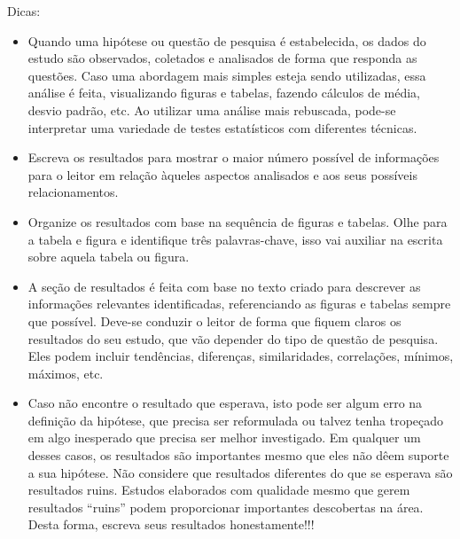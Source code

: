 Dicas:
    \begin{itemize}
        \item Quando uma hipótese ou questão de pesquisa é estabelecida, os dados do estudo são observados, coletados e analisados de forma que responda as questões. Caso uma abordagem mais simples esteja sendo utilizadas, essa análise é feita, visualizando figuras e tabelas, fazendo cálculos de média, desvio padrão, etc. Ao utilizar uma análise mais rebuscada, pode-se interpretar uma variedade de testes estatísticos com diferentes técnicas.
        \item Escreva os resultados para mostrar o maior número possível de informações para o leitor em relação àqueles aspectos analisados e aos seus possíveis relacionamentos.
    \item Organize os resultados com base na sequência de figuras e tabelas. Olhe para a tabela e figura e identifique três palavras-chave, isso vai auxiliar na escrita sobre aquela tabela ou figura.
    \item A seção de resultados é feita com base no texto criado para descrever as informações relevantes identificadas, referenciando as figuras e tabelas sempre que possível. Deve-se conduzir o leitor de forma que fiquem claros os resultados do seu estudo, que vão depender do tipo de questão de pesquisa. Eles podem incluir tendências, diferenças, similaridades, correlações, mínimos, máximos, etc.
    
    \item Caso não encontre o resultado que esperava, isto pode ser algum erro na definição da hipótese, que precisa ser reformulada ou talvez tenha tropeçado em algo inesperado que precisa ser melhor investigado. Em qualquer um desses casos, os resultados são importantes mesmo que eles não dêem suporte a sua hipótese. Não considere que resultados diferentes do que se esperava são resultados ruins. Estudos elaborados com qualidade mesmo que gerem resultados “ruins” podem proporcionar importantes descobertas na área. Desta forma, escreva seus resultados honestamente!!!

    \end{itemize}